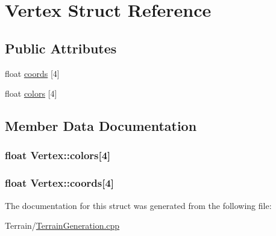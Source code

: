 \hypertarget{struct_vertex}{}\section{Vertex Struct Reference}
\label{struct_vertex}
\subsection*{Public Attributes}
\begin{DoxyCompactItemize}
\item 
float \hyperlink{struct_vertex_a4a599a225bb59f9445889194b97255c0}{coords} \mbox{[}4\mbox{]}
\item 
float \hyperlink{struct_vertex_a8d3f604e57b14e0f16045f267d299b2d}{colors} \mbox{[}4\mbox{]}
\end{DoxyCompactItemize}


\subsection{Member Data Documentation}
\hypertarget{struct_vertex_a8d3f604e57b14e0f16045f267d299b2d}{}
\subsubsection[{colors}]{\setlength{\rightskip}{0pt plus 5cm}float Vertex\+::colors\mbox{[}4\mbox{]}}\label{struct_vertex_a8d3f604e57b14e0f16045f267d299b2d}
\hypertarget{struct_vertex_a4a599a225bb59f9445889194b97255c0}{}
\subsubsection[{coords}]{\setlength{\rightskip}{0pt plus 5cm}float Vertex\+::coords\mbox{[}4\mbox{]}}\label{struct_vertex_a4a599a225bb59f9445889194b97255c0}


The documentation for this struct was generated from the following file\+:\begin{DoxyCompactItemize}
\item 
Terrain/\hyperlink{_terrain_generation_8cpp}{Terrain\+Generation.\+cpp}\end{DoxyCompactItemize}
